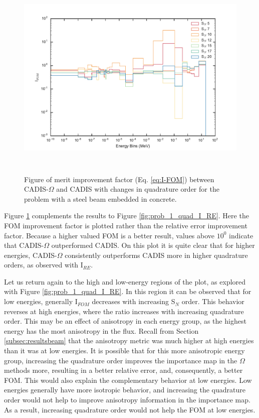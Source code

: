 \begin{figure}[h!]
  \centering
  \includegraphics[height=10cm]{./chapters/characterization_probs/figures/angle/prob_1/compare_fom_quad.pdf}
  \caption[Figure of merit improvement factor  (Eq. \eqref{eq:I-FOM}) between CADIS-$\Omega$ and
  CADIS with changes in quadrature order for steel beam embedded in concrete.]
  {Figure of merit improvement factor  (Eq. \eqref{eq:I-FOM}) between CADIS-$\Omega$ and
   CADIS with changes in quadrature order for the problem with
   a steel beam embedded in concrete.}
  \label{fig:prob_1_quad_I_FOM}
\end{figure}

Figure \ref{fig:prob_1_quad_I_FOM} complements the results to Figure
\ref{fig:prob_1_quad_I_RE}. Here the FOM improvement factor is plotted rather
than the relative error improvement factor. Because a higher valued FOM is a
better result, values above $10^{0}$ indicate that CADIS-$\Omega$ outperformed
CADIS. On this plot it is quite clear that for higher energies, CADIS-$\Omega$
consistently outperforms CADIS more
in higher quadrature orders, as observed with I$_{RE}$.

Let us return again to the high and low-energy regions of the plot, as explored
with Figure \ref{fig:prob_1_quad_I_RE}. In this region it can be observed
that for low energies, generally I$_{FOM}$ decreases with increasing
S$_{N}$ order. This behavior reverses at high energies, where the ratio
increases with increasing quadrature order. This may be an effect of anisotropy
in each energy group, as the highest energy has the most anisotropy in the flux.
Recall from Section \ref{subsec:resultsbeam} that the anisotropy metric was much
higher at high energies than it was at low energies. It is possible that for
this more anisotropic energy group, increasing the quadrature order improves the
importance map in the $\Omega$ methods more, resulting in a better relative
error, and, consequently, a better FOM.
This would also explain the complementary behavior at low energies. Low
energies generally have more isotropic behavior, and increasing the quadrature
order would not help to improve anisotropy information in the importance map.
As a result, increasing quadrature order would not help the FOM at low energies.

